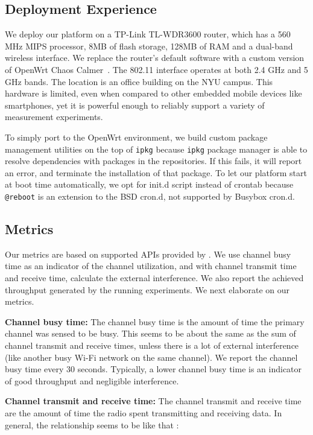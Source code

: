 \subsection{Deployment Experience}
\label{ssec.deployment}
We deploy our platform on a TP-Link TL-WDR3600 router, which has a 560 MHz MIPS processor, 8MB of flash storage, 128MB of RAM and a dual-band wireless interface. We replace the router's default software with a custom version of OpenWrt Chaos Calmer~\cite{openwrt}. The 802.11 interface operates at both 2.4 GHz and 5 GHz bands. The location is an office building on the NYU campus. This hardware is limited, even when compared to other embedded mobile devices like smartphones, yet it is powerful enough to reliably support a variety of measurement experiments.

To simply port to the OpenWrt environment, we build custom package management utilities on the top of \texttt{ipkg} because \texttt{ipkg} package manager is able to resolve dependencies with packages in the repositories. If this fails, it will report an error, and terminate the installation of that package. To let our platform start at boot time automatically, we opt for init.d script instead of crontab because \texttt{@reboot} is an extension to the BSD cron.d, not supported by Busybox cron.d.

\subsection{Metrics}
\label{ssec.metrics}

Our metrics are based on supported APIs provided by \sysname. We use channel busy time as an indicator of the channel utilization, and with channel transmit time and receive time, calculate the external interference. We also report the achieved throughput generated by the running experiments. We next elaborate on our metrics.

\textbf{Channel busy time:} The channel busy time is the amount of time the primary channel was sensed to be busy. This seems to be about the same as the sum of channel transmit and receive times, unless there is a lot of external interference (like another busy Wi-Fi network on the same channel)\cite{channelsurvey}. We report the channel busy time every 30 seconds. Typically, a lower channel busy time is an indicator of good throughput and negligible interference.

\textbf{Channel transmit and receive time:} The channel transmit and receive time are the amount of time the radio spent transmitting and receiving data. In general, the relationship seems to be like that \cite{cfg80211}: 

